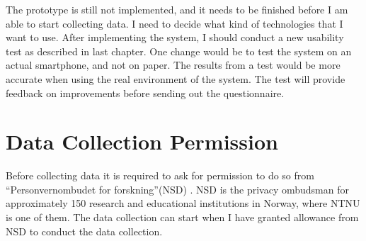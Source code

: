   The prototype is still not implemented, and it needs to be finished before I am able to start collecting data. I need to decide what kind of technologies that I want to use. After implementing the system, I should conduct a new usability test as described in last chapter. One change would be to test the system on an actual smartphone, and not on paper. The results from a test would be more accurate when using the real environment of the system. The test will provide feedback on improvements before sending out the questionnaire. 

\section{Data Collection Permission}

  Before collecting data it is required to ask for permission to do so from ``Personvernombudet for forskning''(NSD) \cite{personvernombud}. NSD is the privacy ombudsman for approximately 150 research and educational institutions in Norway, where NTNU is one of them. The data collection can start when I have granted allowance from NSD to conduct the data collection.